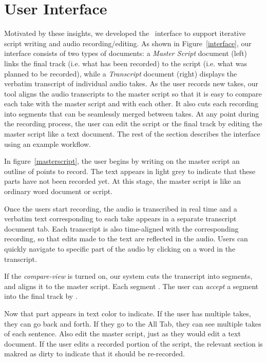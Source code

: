 \section{User Interface}
Motivated by these insights, we developed the \systemname\  interface to support iterative script writing and  audio recording/editing. As shown in Figure~\ref{interface}, our interface consists of two types of documents: a \textit{Master Script} document (left) links the final track (i.e. what has been recorded) to the script (i.e. what was planned to be recorded), while a \textit{Transcript} document (right) displays the verbatim transcript of individual audio takes. As the user records new takes, our tool aligns the audio transcripts to the master script so that it is easy to compare each take with the master script and with each other. It also cuts each recording into segments that can be seamlessly merged between takes. At any point during the recording process, the user can edit the script or the final track by editing the master script like a text document. The rest of the section describes the interface using an example workflow. 

In figure~\ref{masterscript}, the user begins by writing on the master script an outline  of points to record. The text appears in light grey to indicate that these parts have not been recorded yet. At this stage, the master script is like an ordinary
word document or script. 

Once the users start recording, the audio is transcribed in real time and a verbatim text corresponding to each take appears in a separate transcript document tab. Each transcript is also time-aligned with the corresponding recording, so that edits made to the text are reflected in the audio. Users can quickly navigate to specific part of the audio by clicking on a word in the transcript. 

If the \textit{compare-view} is turned on, our system cuts the transcript into segments, and aligns it to the master script. Each segment .  The user can \textit{accept} a segment into the final track by . 

Now that part appears in text color to indicate. If the user has multiple takes, they can go back and forth. If they go to the All Tab, they can see multiple takes of each sentence.
Also edit the master script, just as they would edit a text document. If the user edits a recorded portion of the script, the relevant section is makred as dirty to indicate that it should be re-recorded.

